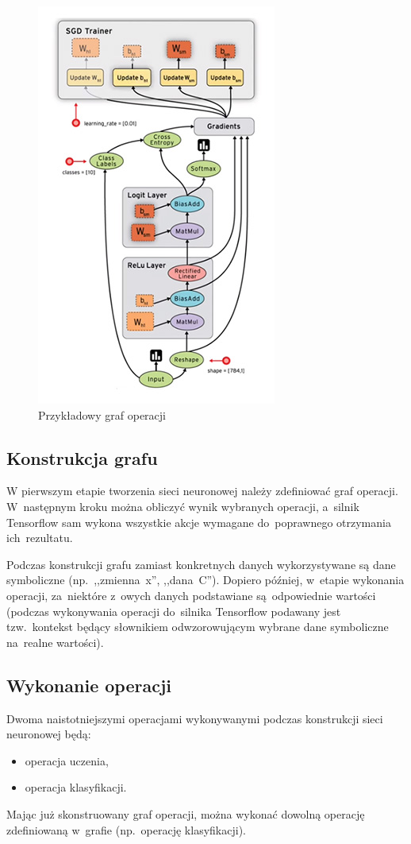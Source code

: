 \begin{figure}[H]
	\centering
	\includegraphics[width=0.5\linewidth]{img/tf-sample-graph.jpg}
	\caption{Przykładowy graf operacji}
	\label{img:tf-smpl-grf}
\end{figure}

\subsection{Konstrukcja grafu}
W pierwszym etapie tworzenia sieci neuronowej należy zdefiniować graf operacji. W~następnym kroku można obliczyć
wynik wybranych operacji, a~silnik Tensorflow sam wykona wszystkie akcje wymagane do~poprawnego otrzymania
ich~rezultatu.

Podczas konstrukcji grafu zamiast konkretnych danych wykorzystywane są dane symboliczne (np.~,,zmienna~x'',
,,dana~C''). Dopiero później, w~etapie wykonania operacji, za~niektóre z~owych danych podstawiane
są~odpowiednie wartości (podczas wykonywania operacji do~silnika Tensorflow podawany jest tzw.~kontekst będący
słownikiem odwzorowującym wybrane dane symboliczne na~realne wartości).


\subsection{Wykonanie operacji}
Dwoma naistotniejszymi operacjami wykonywanymi podczas konstrukcji sieci neuronowej będą:
\begin{itemize}
    \item operacja uczenia,
    \item operacja klasyfikacji.
\end{itemize}

Mając już skonstruowany graf operacji, można wykonać dowolną operację zdefiniowaną w~grafie (np.~operację klasyfikacji).

